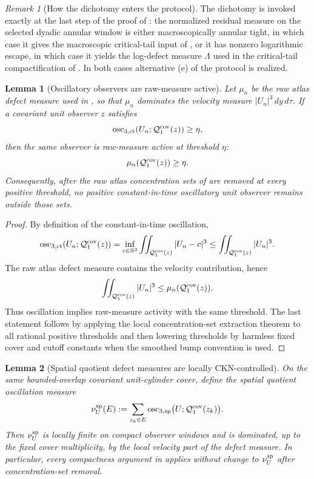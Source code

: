 \documentclass[11pt]{amsart}
\numberwithin{equation}{section}
\theoremstyle{plain}
\newtheorem{lemma}[lemma]{Lemma}
\theoremstyle{definition}
\theoremstyle{remark}
\newtheorem{remark}[remark]{Remark}
\newcommand{\oscsp}{\operatorname{osc}_{3,\mathrm{sp}}}
\newcommand{\actthree}{\operatorname{osc}_{3,\mathrm{ct}}}
\begin{document}
\begin{remark}[How the dichotomy enters the protocol]
\label{rem:annular-dichotomy-protocol}
The dichotomy
 is invoked exactly at the
last step of the proof of
: the normalized residual
measure on the selected dyadic annular window is either macroscopically
annular tight, in which case it gives the macroscopic critical-tail input of
, or it has nonzero logarithmic
escape, in which case it yields the log-defect measure \(\Lambda\) used in
the critical-tail compactification of
.  In both cases alternative
\textup{(e)} of the protocol is realized.
\end{remark}

\begin{lemma}[Oscillatory observers are raw-measure active]
\label{lem:oscillation-active-implies-raw-active}
Let \(\mu_n\) be the raw atlas defect measure used in
, so that \(\mu_n\) dominates the velocity
measure \(|U_n|^3\,dy\,d\tau\).  If a covariant unit observer \(z\) satisfies
\[
   \actthree(U_n;\mathcal Q_1^{\rm cov}(z))\ge\eta ,
\]
then the same observer is raw-measure active at threshold \(\eta\):
\[
   \mu_n(\mathcal Q_1^{\rm cov}(z))\ge\eta .
\]
Consequently, after the raw atlas concentration sets of
 are removed at every positive threshold, no
positive constant-in-time oscillatory unit observer remains outside those sets.
\end{lemma}

\begin{proof}
By definition of the constant-in-time oscillation,
\[
   \actthree(U_n;\mathcal Q_1^{\rm cov}(z))
   =
   \inf_{c\in\mathbb R^3}
      \iint_{\mathcal Q_1^{\rm cov}(z)}|U_n-c|^3
   \le
   \iint_{\mathcal Q_1^{\rm cov}(z)}|U_n|^3 .
\]
The raw atlas defect measure contains the velocity contribution, hence
\[
   \iint_{\mathcal Q_1^{\rm cov}(z)}|U_n|^3
   \le
   \mu_n(\mathcal Q_1^{\rm cov}(z)).
\]
Thus oscillation implies raw-measure activity with the same threshold.  The
last statement follows by applying the local concentration-set extraction theorem to
all rational positive thresholds and then lowering thresholds by harmless fixed
cover and cutoff constants when the smoothed bump convention is used.
\end{proof}

\begin{lemma}[Spatial quotient defect measures are locally CKN-controlled]
\label{lem:spatial-quotient-defect-cKN-control}
On the same bounded-overlap covariant unit-cylinder cover, define the spatial
quotient oscillation measure
\[
   \nu_U^{\rm sp}(E)
   :=
   \sum_{z_k\in E}
      \oscsp\bigl(U;\mathcal Q_1^{\rm cov}(z_k)\bigr).
\]
Then \(\nu_U^{\rm sp}\) is locally finite on compact observer windows and is
dominated, up to the fixed cover multiplicity, by the local velocity part of
the defect measure.  In particular, every compactness argument in
 applies without change to
\(\nu_U^{\rm sp}\) after concentration-set removal.
\end{lemma}
\end{document}
